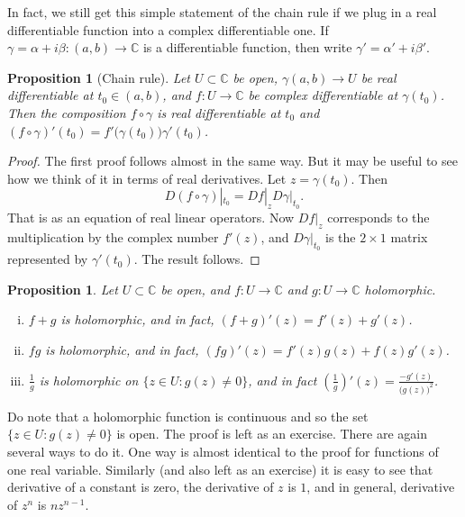 \documentclass[12pt,openany]{book}
\newcommand{\C}{{\mathbb{C}}}
\theoremstyle{plain}
\newtheorem{prop}[thm]{Proposition}
\theoremstyle{remark}
\theoremstyle{definition}
\theoremstyle{exercise}
\theoremstyle{example}
\begin{document}
In fact, we still get this simple statement of the chain rule
if we plug in a real differentiable function into a complex differentiable
one.  If $\gamma = \alpha + i \beta \colon (a,b)
\to \C$ is a differentiable function,
then write $\gamma' = \alpha' + i \beta'$.

\begin{prop}[Chain rule] \label{prop:chainrule2}
Let $U \subset \C$ be open,
$\gamma (a,b) \to U$ be real differentiable at $t_0 \in (a,b)$,
and $f \colon U \to \C$ be complex differentiable at $\gamma(t_0)$.
Then the composition $f \circ \gamma$ is real differentiable
at $t_0$ and $(f \circ \gamma)'(t_0) = f'\bigl(\gamma(t_0)\bigr) \gamma'(t_0)$.
\end{prop}

\begin{proof}
The first proof follows almost in the same way.  But it may be useful to see
how we think of it in terms of real derivatives.
Let $z = \gamma(t_0)$.  Then 
\begin{equation*}
D(f \circ \gamma)|_{t_0} =
Df|_z D\gamma|_{t_0} .
\end{equation*}
That is as an equation of real linear operators.  Now $Df|_z$ corresponds
to the multiplication by the complex number $f'(z)$, and $D\gamma|_{t_0}$
is the $2 \times 1$ matrix represented by $\gamma'(t_0)$.
The result follows.
\end{proof}

\begin{prop} \label{prop:sumproddiv}
Let $U \subset \C$ be open, and $f \colon U \to \C$ and
$g \colon U \to \C$ holomorphic.
\begin{enumerate}[(i)]
\item
$f+g$ is holomorphic, and in fact, $(f+g)'(z) = f'(z) + g'(z)$.
\item
$fg$ is holomorphic, and in fact, $(fg)'(z) = f'(z)g(z) + f(z)g'(z)$.
\item
$\frac{1}{g}$ is holomorphic on $\{ z \in U : g(z) \not= 0 \}$, and in fact
${\left(\frac{1}{g}\right)}'(z) = \frac{-g'(z)}{{\bigl(g(z)\bigr)}^2}$.
\end{enumerate}
\end{prop}

Do note that a holomorphic function is continuous and so the set
$\{ z \in U : g(z) \not= 0 \}$ is open.
The proof is left as an exercise.  There are again several ways
to do it.  One way is almost identical to the
proof for functions of one real variable. %
Similarly (and also left as an exercise) it is easy to see that derivative
of a constant is zero, the derivative of $z$ is $1$, and in general,
derivative of $z^n$ is $nz^{n-1}$.
\end{document}
